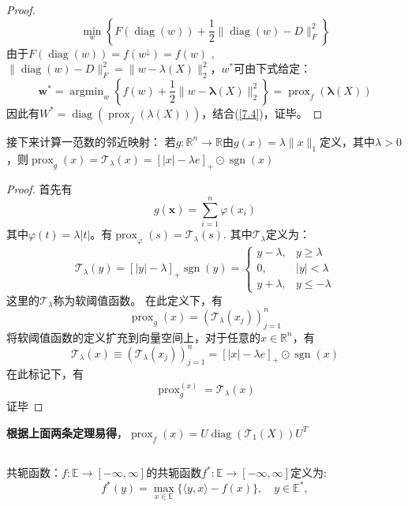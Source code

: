 \documentclass[fontset=mac]{ctexart}
\begin{document}
\begin{proof}
		\begin{equation}
			\min _{{w}}\left\{F(\operatorname{diag}({w}))+\frac{1}{2}\|\operatorname{diag}({w})-{D}\|_{F}^{2}\right\}
		\end{equation}
		由于$F(\operatorname{diag}(w)) = f\left({w}^{\downarrow}\right)=f({w})$ , $\| \operatorname{diag}(w) - D\| ^2_F = \|w - \lambda(X)\|^2_2$，$w^*$可由下式给定：
		\begin{equation}
			\mathbf{w}^{*}=\operatorname{argmin}_{{w}}\left\{f({w})+\frac{1}{2}\|{w}-\boldsymbol{\lambda}({X})\|_{2}^{2}\right\}=\operatorname{prox}_{f}(\boldsymbol{\lambda}({X}))
		\end{equation}
		因此有$W^* = \operatorname{diag}(\operatorname{prox}_f(\lambda(X)))$，结合(\ref{7.4})，证毕。
	\end{proof}

	接下来计算一范数的邻近映射：
	若$g: \mathbb{R}^n \to \mathbb{R}$由$g(x) = \lambda\|x\|_1$定义，其中$\lambda > 0$，则$\operatorname{prox}_g(x) = \mathcal{T}_{\lambda}({x})=[|{x}|-\lambda {e}]_{+} \odot \operatorname{sgn}({x})$
	
	\begin{proof}
		首先有
		$$
		g(\mathbf{x})=\sum_{i=1}^{n} \varphi\left(x_{i}\right)
		$$
		其中$\varphi(t) = \lambda |t|$。有$\operatorname{prox}_{\varphi}(s) =\mathcal{T}_{\lambda}(s)$. 其中$\mathcal{T}_{\lambda}$定义为：
		$$
		\mathcal{T}_{\lambda}(y)=[|y|-\lambda]_{+} \operatorname{sgn}(y)=\left\{\begin{array}{ll}
			y-\lambda, & y \geq \lambda \\
			0, & |y|<\lambda \\
			y+\lambda, & y \leq-\lambda
		\end{array}\right.
		$$
		这里的$\mathcal{T}_{\lambda}$称为软阈值函数。
		在此定义下，有
		$$
		\operatorname{prox}_{g}({x})=\left(\mathcal{T}_{\lambda}\left(x_{j}\right)\right)_{j=1}^{n}
		$$
		将软阈值函数的定义扩充到向量空间上，对于任意的$x \in \mathbb{R}^n$，有
		$$
		\mathcal{T}_{\lambda}({x}) \equiv\left(\mathcal{T}_{\lambda}\left(x_{j}\right)\right)_{j=1}^{n}=[|{x}|-\lambda {e}]_{+} \odot \operatorname{sgn}({x})
		$$
		在此标记下，有
		$$
		\operatorname{prox}_g^{(x)} = \mathcal{T}_{\lambda}(x)
		$$
		证毕
	\end{proof}
	\textbf{根据上面两条定理易得}，$\operatorname{prox}_f(x)=U\operatorname{diag}(\mathcal{T}_{1}(X))U^T$
	
	\newpage	
	\subsection{}
	共轭函数：$f: \mathbb{E} \to [-\infty, \infty]$的共轭函数$f^*: \mathbb{E} \to [-\infty, \infty]$定义为:
	$$
	f^{*}({y})=\max _{{x} \in \mathbb{E}}\{\langle{y}, {x}\rangle-f({x})\}, \quad {y} \in \mathbb{E}^{*},
	$$
	
\end{document}
